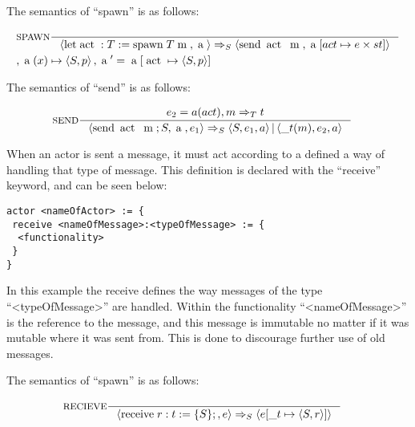 The semantics of \enquote{spawn} is as follows:

\begin{align*}
&\inference[$\text{SPAWN}$]{}
                       {\Braket{\Tlet \Tact:T := \Tspawn \; T \Tm,\Ta} \Rightarrow_S \Braket{\Tsend \Tact \Tm,\Ta[act \mapsto e \times st]}}
\\
&												{, \Ta(x) \mapsto \Braket{S,p} , \Ta' = \Ta[\Tact \mapsto \Braket{S, p}]}
\end{align*}





The semantics of \enquote{send} is as follows:

\begin{align*}
&\inference[$\text{SEND}$]{e_2 = a(act),m \Rightarrow_T t}
                       {\Braket{\Tsend \Tact \Tm ; S,\Ta,e_1} \Rightarrow_S \Braket{S,e_1,a}|\Braket{\_t(m),e_2,a}}
\end{align*}

When an actor is sent a message, it must act according to a defined a way of handling that type of message. This definition is declared with the \enquote{receive} keyword, and can be seen below:

\label{actorfuncReceive}
\begin{lstlisting}
actor <nameOfActor> := {
 receive <nameOfMessage>:<typeOfMessage> := {
  <functionality>
 }
}
\end{lstlisting}

In this example the receive defines the way messages of the type \enquote{<typeOfMessage>} are handled. Within the functionality \enquote{<nameOfMessage>} is the reference to the message, and this message is immutable no matter if it was mutable where it was sent from. This is done to discourage further use of old messages.

The semantics of \enquote{spawn} is as follows:

\begin{align*}
&\inference[$\text{RECIEVE}$]{}
                           {\Braket{\Treceive r:t := \{S\};,e} \Rightarrow_S \Braket{e[\_t \mapsto \Braket{S,r}]}}
\end{align*}

